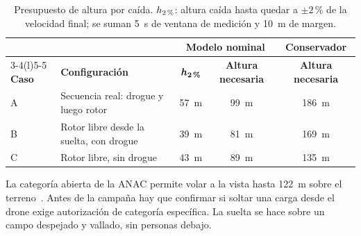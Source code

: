 \begin{table}[H]
\centering\small
\caption{Presupuesto de altura por caída. $h_{\text{2\,\%}}$: altura caída hasta quedar a
$\pm2$\,\% de la velocidad final; se suman \SI{5}{s} de ventana de medición y \SI{10}{m}
de margen.}
\label{tab:ensayos-altura}
\begin{tabular}{@{}llccc@{}}
\toprule
& & \multicolumn{2}{c}{\textbf{Modelo nominal}} & \textbf{Conservador}\\\cmidrule(lr){3-4}\cmidrule(l){5-5}
\textbf{Caso} & \textbf{Configuración} & $\boldsymbol{h}_{\text{\textbf{2\,\%}}}$ & \textbf{Altura necesaria} & \textbf{Altura necesaria}\\\midrule
A & Secuencia real: drogue y luego rotor & \SI{57}{m} & \SI{99}{m} & \SI{186}{m}\\
B & Rotor libre desde la suelta, con drogue & \SI{39}{m} & \SI{81}{m} & \SI{169}{m}\\
C & Rotor libre, sin drogue & \SI{43}{m} & \SI{89}{m} & \SI{135}{m}\\
\bottomrule
\end{tabular}
\end{table}

\begin{nota}
La categoría abierta de la ANAC permite volar a la vista hasta \SI{122}{m} sobre el
terreno~\cite{ensayos-anac2025}. Antes de la campaña hay que confirmar si soltar una carga
desde el drone exige autorización de categoría específica. La suelta se hace sobre un
campo despejado y vallado, sin personas debajo.
\end{nota}

